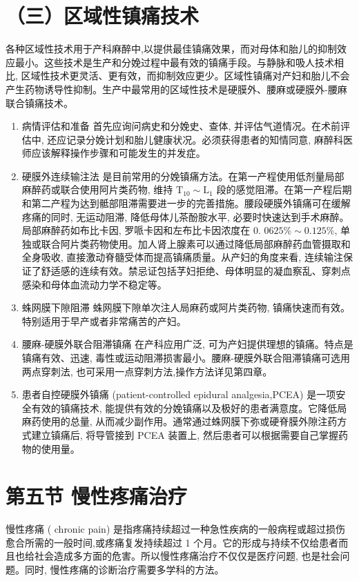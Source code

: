 \documentclass[10pt]{article}
\begin{document}
\section*{（三）区域性镇痛技术}
各种区域性技术用于产科麻醉中,以提供最佳镇痛效果，而对母体和胎儿的抑制效应最小。这些技术是生产和分娩过程中最有效的镇痛手段。与静脉和吸人技术相比, 区域性技术更灵活、更有效，而抑制效应更少。区域性镇痛对产妇和胎儿不会产生药物诱导性抑制。生产中最常用的区域性技术是硬膜外、腰麻或硬膜外-腰麻联合镇痛技术。

\begin{enumerate}
  \item 病情评估和准备 首先应询问病史和分娩史、查体, 并评估气道情况。在术前评估中, 还应记录分娩计划和胎儿健康状况。必须获得患者的知情同意, 麻醉科医师应该解释操作步骤和可能发生的并发症。

  \item 硬膜外连续输注法 是目前常用的分娩镇痛方法。在第一产程使用低剂量局部麻醉药或联合使用阿片类药物, 维持 $\mathrm{T}_{10} \sim \mathrm{L}_{1}$ 段的感觉阻滞。在第一产程后期和第二产程为达到骶部阻滞需要进一步的完善措施。腰段硬膜外镇痛可在缓解疼痛的同时, 无运动阻滞, 降低母体儿茶酚胺水平, 必要时快速达到手术麻醉。局部麻醉药如布比卡因, 罗哌卡因和左布比卡因浓度在 0. $0625 \% \sim 0.125 \%$, 单独或联合阿片类药物使用。加人肾上腺素可以通过降低局部麻醉药血管摄取和全身吸收, 直接激动脊髓受体而提高镇痛质量。从产妇的角度来看, 连续输注保证了舒适感的连续有效。禁忌证包括芓妇拒绝、母体明显的凝血察乱、穿刺点感染和母体血流动力学不稳定等。

  \item 蛛网膜下隙阻滞 蛛网膜下隙单次注人局麻药或阿片类药物, 镇痛快速而有效。特别适用于早产或者非常痛苦的产妇。

  \item 腰麻-硬膜外联合阻滞镇痛 在产科应用广泛, 可为产妇提供理想的镇痛。特点是镇痛有效、迅速, 毒性或运动阻滞损害最小。腰麻-硬膜外联合阻滞镇痛可选用两点穿刺法, 也可采用一点穿刺方法,操作方法详见第四章。

  \item 患者自控硬膜外镇痛 (patient-controlled epidural analgesia,PCEA) 是一项安全有效的镇痛技术, 能提供有效的分娩镇痛以及极好的患者满意度。它降低局麻药使用的总量, 从而减少副作用。通常通过蛛网膜下弥或硬脊膜外隙注药方式建立镇痛后, 将导管接到 PCEA 装置上, 然后患者可以根据需要自己掌握药物的使用量。

\end{enumerate}

\section*{第五节 慢性疼痛治疗}
慢性疼痛 ( chronic pain) 是指疼痛持续超过一种急性疾病的一般病程或超过损伤愈合所需的一般时间,或疼痛复发持续超过 1 个月。它的形成与持续不仅给患者而且也给社会造成多方面的危害。所以慢性疼痛治疗不仅仅是医疗问题, 也是社会问题。同时, 慢性疼痛的诊断治疗需要多学科的方法。
\end{document}

